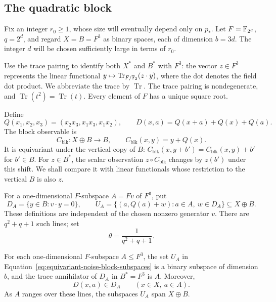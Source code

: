 \subsection{The quadratic block}

Fix an integer $r_0\ge1$, whose size will eventually depend only on $p_*$.
Let
$F=\mathbb F_{2^d}$, $q=2^d$, and regard $X=B=F^3$ as binary spaces, each of
dimension $b=3d$.  The integer $d$ will be chosen sufficiently large in terms
of $r_0$.

Use the trace pairing to identify both $X^*$ and $B^*$ with $F^3$:
the vector $z\in F^3$ represents the linear functional
$y\mapsto\operatorname{Tr}_{F/\mathbb F_2}(z\cdot y)$, where the dot denotes the
field dot product.  We abbreviate the trace by $\operatorname{Tr}$.
The trace pairing is nondegenerate, and
$\operatorname{Tr}(t^2)=\operatorname{Tr}(t)$.  Every element of $F$ has a
unique square root.

Define
\begin{equation}\label{eq:equivariant-noise-quadratic}
 Q(x_1,x_2,x_3)=(x_2x_3,x_1x_3,x_1x_2),
 \qquad
 D(x,a)=Q(x+a)+Q(x)+Q(a).
\end{equation}
The block observable is
\[
 C_{\mathrm{blk}}:X\oplus B\longrightarrow B,
 \qquad C_{\mathrm{blk}}(x,y)=y+Q(x).
\]
It is equivariant under the vertical copy of $B$:
$C_{\mathrm{blk}}(x,y+b')=C_{\mathrm{blk}}(x,y)+b'$ for $b'\in B$.
For $z\in B^*$, the scalar observation $z\circ C_{\mathrm{blk}}$ changes
by $z(b')$ under this shift.  We shall compare it with linear functionals
whose restriction to the vertical $B$ is also $z$.

For a one-dimensional $F$-subspace $A=Fv$ of $F^3$, put
\begin{equation}\label{eq:equivariant-noise-block-subspaces}
 D_A=\{y\in B:v\cdot y=0\},
 \qquad
 U_A=\{(a,Q(a)+w):a\in A,\ w\in D_A\}\subseteq X\oplus B.
\end{equation}
These definitions are independent of the chosen nonzero generator $v$.
There are $q^2+q+1$ such lines; set
\begin{equation}\label{eq:equivariant-noise-theta}
 \theta=\frac{1}{q^2+q+1}.
\end{equation}

\begin{lemma}\label{lem:equivariant-noise-block}
For each one-dimensional $F$-subspace $A\le F^3$, the set $U_A$
in Equation~\eqref{eq:equivariant-noise-block-subspaces} is a binary subspace of
dimension $b$, and the trace annihilator of $D_A$ in $B^*=F^3$ is $A$.
Moreover,
\[
 D(x,a)\in D_A\qquad(x\in X,\ a\in A).
\]
As $A$ ranges over these lines, the subspaces $U_A$ span $X\oplus B$.
\end{lemma}


